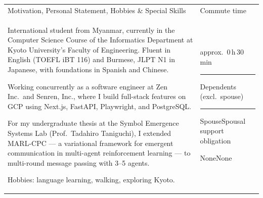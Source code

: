 \documentclass[a4paper,10pt]{article}
\newcommand{\fieldlabel}[1]{\small\textsf{#1}}
\begin{document}
\vspace{4pt}

\noindent
\begin{tabular}{|m{11.5cm}|m{5.7cm}|}
  \hline
  \fieldlabel{Motivation, Personal Statement, Hobbies \& Special Skills} & \fieldlabel{Commute time}\\
  \begin{minipage}[t][6.5cm][t]{11.5cm}
    \setlength{\parskip}{4pt}
    International student from Myanmar, currently in the Computer Science Course of the Informatics Department at Kyoto University's Faculty of Engineering. Fluent in English (TOEFL iBT 116) and Burmese, JLPT N1 in Japanese, with foundations in Spanish and Chinese.\par
    Working concurrently as a software engineer at Zen Inc.\ and Senren, Inc., where I build full-stack features on GCP using Next.js, FastAPI, Playwright, and PostgreSQL.\par
    For my undergraduate thesis at the Symbol Emergence Systems Lab (Prof.\ Tadahiro Taniguchi), I extended MARL-CPC — a variational framework for emergent communication in multi-agent reinforcement learning — to multi-round message passing with 3--5 agents.\par
    Hobbies: language learning, walking, exploring Kyoto.
  \end{minipage}
  &
  \begin{minipage}[t][6.5cm][t]{5.7cm}
    \centering approx.\ 0\,h\,30\,min\par
    \vspace{6pt}\hrule\vspace{6pt}
    \fieldlabel{Dependents (excl.\ spouse)}\par
    \vspace{4pt}\centering 0\par
    \vspace{6pt}\hrule\vspace{6pt}
    \fieldlabel{Spouse}\hfill \fieldlabel{Spousal support obligation}\par
    \vspace{4pt}\centering None\hspace{2.5em}None
  \end{minipage}
  \\
  \hline
\end{tabular}

\vspace{4pt}
\end{document}
